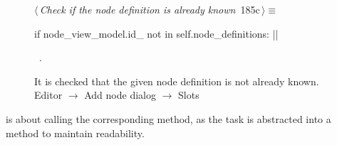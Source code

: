 \documentclass[%
    a4paper,    %
    justified,  %
    nobib,      %
    openany     %
]{tufte-book}
\makeatletter
\renewcommand{\label}[1]{\@tufte@label{##1}}%
\makeatother
\begin{document}
\begin{figure}[!htbp]
\begin{flushleft} \small
\begin{minipage}{\linewidth}\label{scrap161}\raggedright\small
{} $\langle\,${\itshape Check if the node definition is already known}\nobreak\ {\footnotesize {185c}}$\,\rangle\equiv$
\vspace{-1ex}
\begin{pythoncode}
if node_view_model.id_ not in self.node_definitions:
|\NWsep|
\end{pythoncode}
\vspace{1.5ex}
\footnotesize
\begin{list}{}{\setlength{\itemsep}{-\parsep}\setlength{\itemindent}{-\leftmargin}}
\item \NWtxtMacroRefIn\ .

\item{}
\end{list}
\end{minipage}\vspace{4ex}
\end{flushleft}
\vspace*{-20mm}\caption{It is checked that the given node definition is not already known.
  \newline{}\newline{}Editor $\rightarrow$ Add node dialog $\rightarrow$ Slots}
\end{figure}

 is about calling the corresponding
method, as the task is abstracted into a method to maintain readability.
\end{document}
